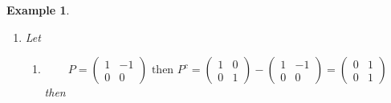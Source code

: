 \documentclass[aps,preprint]{revtex4}
\newtheorem{example}[theorem]{Example}
\begin{document}
\begin{example}
\begin{enumerate}
\begin{enumerate}
\item 
\begin{eqnarray}
P^{c}\left( 
\begin{array}{c}
0 \\ 
1%
\end{array}%
\right) &=&\left( 
\begin{array}{cc}
0 & 0 \\ 
0 & 1%
\end{array}%
\right) \left( 
\begin{array}{c}
0 \\ 
1%
\end{array}%
\right) =\left( 
\begin{array}{c}
0 \\ 
1%
\end{array}%
\right) \\
\left( P^{c}\right) ^{2} &=&\left( 
\begin{array}{cc}
0 & 0 \\ 
0 & 1%
\end{array}%
\right) ^{2}=\left( 
\begin{array}{cc}
0 & 0 \\ 
0 & 1%
\end{array}%
\right) =P^{c}.
\end{eqnarray}
\end{enumerate}

\item Let

\begin{enumerate}
\item 
\begin{equation}
P=\left( 
\begin{array}{cc}
1 & -1 \\ 
0 & 0%
\end{array}%
\right) \text{ then }P^{c}=\left( 
\begin{array}{cc}
1 & 0 \\ 
0 & 1%
\end{array}%
\right) -\left( 
\begin{array}{cc}
1 & -1 \\ 
0 & 0%
\end{array}%
\right) =\left( 
\begin{array}{cc}
0 & 1 \\ 
0 & 1%
\end{array}%
\right)
\end{equation}
then


\end{enumerate}
\end{enumerate}
\end{example}
\end{document}
